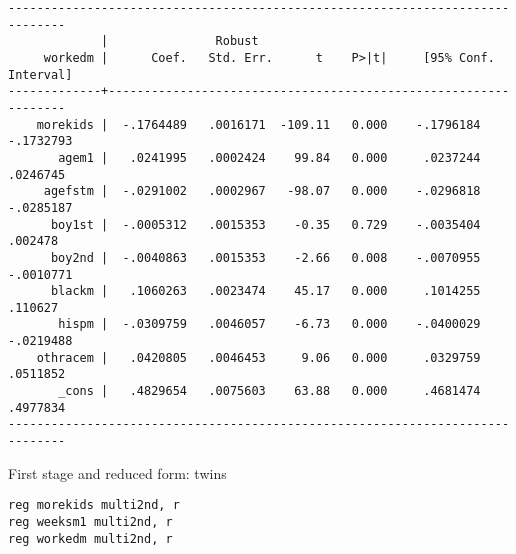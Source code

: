 \documentclass[cache=false]{article}
\begin{document}
\begin{verbatim}
------------------------------------------------------------------------------
             |               Robust
     workedm |      Coef.   Std. Err.      t    P>|t|     [95% Conf. Interval]
-------------+----------------------------------------------------------------
    morekids |  -.1764489   .0016171  -109.11   0.000    -.1796184   -.1732793
       agem1 |   .0241995   .0002424    99.84   0.000     .0237244    .0246745
     agefstm |  -.0291002   .0002967   -98.07   0.000    -.0296818   -.0285187
      boy1st |  -.0005312   .0015353    -0.35   0.729    -.0035404     .002478
      boy2nd |  -.0040863   .0015353    -2.66   0.008    -.0070955   -.0010771
      blackm |   .1060263   .0023474    45.17   0.000     .1014255     .110627
       hispm |  -.0309759   .0046057    -6.73   0.000    -.0400029   -.0219488
    othracem |   .0420805   .0046453     9.06   0.000     .0329759    .0511852
       _cons |   .4829654   .0075603    63.88   0.000     .4681474    .4977834
------------------------------------------------------------------------------
\end{verbatim}

First stage and reduced form: twins
\begin{verbatim}
reg morekids multi2nd, r
reg weeksm1 multi2nd, r
reg workedm multi2nd, r
\end{verbatim}
\end{document}
